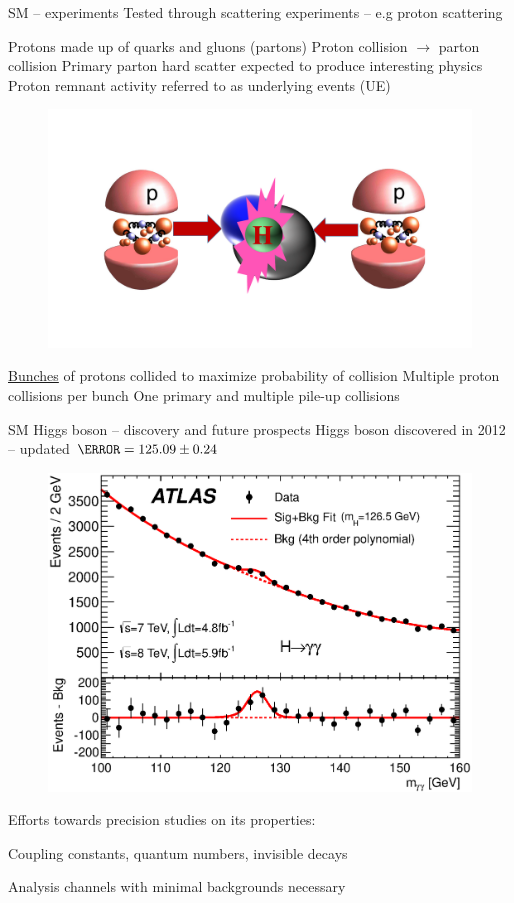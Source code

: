 \documentclass[10pt]{beamer}
\begin{document}
\begin{frame}{SM -- experiments}
\centering
{\color{blue}\large Tested through scattering experiments -- e.g proton scattering} 
\vspace*{-0.5\baselineskip}
\begin{outline}
\1 Protons made up of quarks and gluons (partons) 
	\2 Proton collision $\rightarrow$ parton collision
\1 Primary parton hard scatter expected to produce interesting physics
	\2 Proton remnant activity referred to as  {\color{purple} underlying events (UE)} 
\end{outline}
\begin{figure}
\includegraphics[width=0.8\linewidth]{figures/collision.pdf}
\end{figure}
\begin{outline}
\1 \uline{Bunches} of protons collided to maximize probability of collision 
\1 Multiple proton collisions per bunch 
	\2 One primary and multiple {\color{purple} pile-up} collisions
\end{outline}
\end{frame}

\begin{frame}{SM Higgs boson -- discovery and future prospects}
Higgs boson discovered in 2012 -- updated $\mH=125.09\pm0.24$~\GeV
\vspace*{-0.5\baselineskip}
\begin{figure}
\includegraphics[width=0.7\linewidth]{figures/figaux_004a.eps}
\end{figure}
\vspace*{-1.2\baselineskip}
Efforts towards precision studies on its properties:
\vspace*{-0.5\baselineskip}
\begin{outline}
\1 Coupling constants, quantum numbers, invisible decays
\end{outline}
{\color{blue}\large Analysis channels with minimal backgrounds necessary}
\end{frame}
\end{document}
